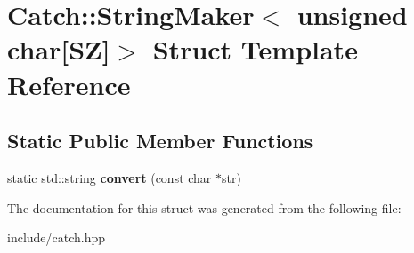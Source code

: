 \hypertarget{structCatch_1_1StringMaker_3_01unsigned_01char[SZ]_4}{}\section{Catch\+:\+:String\+Maker$<$ unsigned char\mbox{[}SZ\mbox{]}$>$ Struct Template Reference}
\label{structCatch_1_1StringMaker_3_01unsigned_01char[SZ]_4}
\subsection*{Static Public Member Functions}
\begin{DoxyCompactItemize}
\item 
static std\+::string {\bfseries convert} (const char $\ast$str)\hypertarget{structCatch_1_1StringMaker_3_01unsigned_01char[SZ]_4_a615e17b55a978cd279442fa293f773f0}{}\label{structCatch_1_1StringMaker_3_01unsigned_01char[SZ]_4_a615e17b55a978cd279442fa293f773f0}

\end{DoxyCompactItemize}


The documentation for this struct was generated from the following file\+:\begin{DoxyCompactItemize}
\item 
include/catch.\+hpp\end{DoxyCompactItemize}
